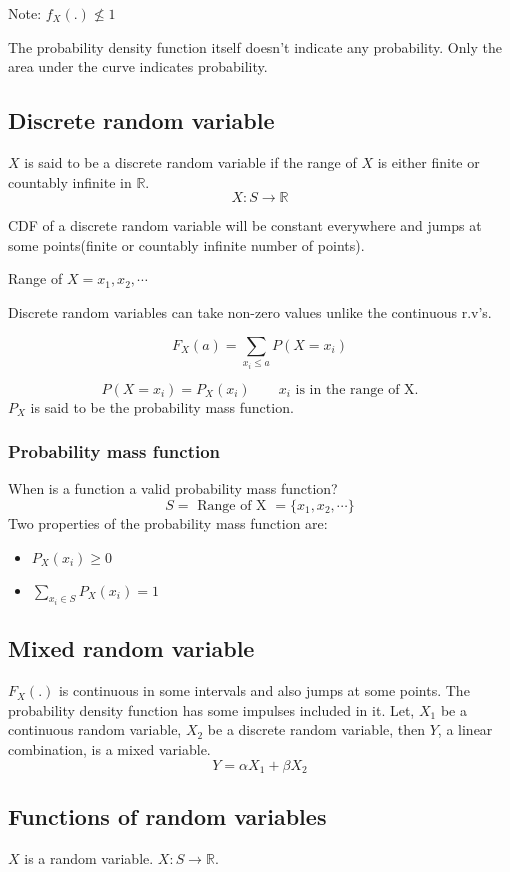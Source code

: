 \documentclass{article}
\begin{document}
Note: $f_X(.) \nleq 1$

The probability density function itself doesn't indicate any probability.
Only the area under the curve indicates probability.

\subsection{Discrete random variable}

$X$ is said to be a discrete random variable if the range of $X$ is either finite or countably infinite in $\mathbb{R}$.
$$ X:S \to \mathbb{R}$$

CDF of a discrete random variable will be constant everywhere and jumps at some points(finite or countably infinite number of points).

Range of $X={x_1,x_2,\cdots}$

Discrete random variables can take non-zero values unlike the continuous r.v's.

$$ F_X(a)= \sum_{x_i \leq a}P(X= x_i)$$

$$ P(X=x_i)= P_X(x_i)\qquad x_i \text{ is in the range of X.}$$
$P_X$ is said to be the probability mass function.

\subsubsection{Probability mass function}
When is a function a valid probability mass function?
$$ S= \text{ Range of X }= \{ x_1, x_2, \cdots\}$$
Two properties of the probability mass function are:
\begin{itemize}
    \item $P_X(x_i) \geq 0$

    \item $ \sum_{x_i \in S}P_X(x_i)=1$
\end{itemize}

\subsection{Mixed random variable}

$F_X(.)$ is continuous in some intervals and also jumps at some points. The probability density function has some impulses included in it. Let, $X_1$ be a continuous random variable, $X_2$ be a discrete random variable, then $Y$, a linear combination, is a mixed variable.
$$ Y= \alpha X_1 +\beta X_2$$

\subsection{Functions of random variables}
$X$ is a random variable. $X: S \to \mathbb{R}$.
\end{document}
